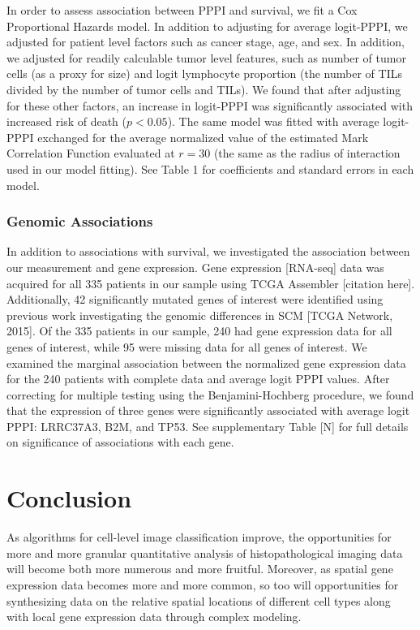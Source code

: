 \documentclass[
]{book}
\begin{document}
In order to assess association between PPPI and survival, we fit
a Cox Proportional Hazards model. In addition to adjusting for
average logit-PPPI, we adjusted for patient level factors such as
cancer stage, age, and sex. In addition, we adjusted for readily
calculable tumor level features, such as number of tumor cells (as
a proxy for size) and logit lymphocyte proportion (the number of
TILs divided by the number of tumor cells and TILs). We found that
after adjusting for these other factors, an increase in logit-PPPI
was significantly associated with increased risk of death
(\(p < 0.05\)). The same model was fitted with average logit-PPPI
exchanged for the average normalized value of the estimated Mark
Correlation Function evaluated at \(r = 30\) (the same as the radius
of interaction used in our model fitting). See Table 1 for
coefficients and standard errors in each model.

\hypertarget{genomic-associations}{%
\subsection{Genomic Associations}\label{genomic-associations}}

In addition to associations with survival, we investigated the
association between our measurement and gene expression. Gene
expression {[}RNA-seq{]} data was acquired for all 335 patients in our
sample using TCGA Assembler {[}citation here{]}. Additionally, 42
significantly mutated genes of interest were identified using
previous work investigating the genomic differences in SCM {[}TCGA
Network, 2015{]}. Of the 335 patients in our sample, 240 had gene
expression data for all genes of interest, while 95 were missing
data for all genes of interest. We examined the marginal association
between the normalized gene expression data for the 240 patients with
complete data and average logit PPPI values. After correcting for
multiple testing using the Benjamini-Hochberg procedure, we found that
the expression of three genes were significantly associated with
average logit PPPI: LRRC37A3, B2M, and TP53. See supplementary Table
{[}N{]} for full details on significance of associations with each gene.

\hypertarget{conclusion}{%
\chapter{Conclusion}\label{conclusion}}

As algorithms for cell-level image classification improve, the
opportunities for more and more granular quantitative analysis of
histopathological imaging data will become both more numerous and
more fruitful. Moreover, as spatial gene expression data becomes
more and more common, so too will opportunities for synthesizing
data on the relative spatial locations of different cell types
along with local gene expression data through complex modeling.
\end{document}

